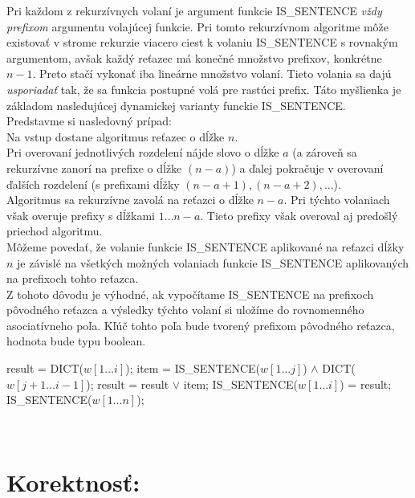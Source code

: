 \documentclass[paper=a4, fontsize=11pt]{scrartcl} %
\numberwithin{equation}{section} %
\numberwithin{figure}{section} %
\numberwithin{table}{section} %
\begin{document}
Pri každom z rekurzívnych volaní je argument funkcie IS\_SENTENCE {\em vždy prefixom} argumentu volajúcej funkcie.
Pri tomto rekurzívnom algoritme môže existovať v strome rekurzie viacero ciest k volaniu IS\_SENTENCE s rovnakým argumentom, avšak každý reťazec má konečné množstvo prefixov, konkrétne $n - 1$.
Preto stačí vykonať iba lineárne množstvo volaní.
Tieto volania sa dajú {\em usporiadať} tak, že sa funkcia postupné volá pre rastúci prefix. 
Táto myšlienka je základom nasledujúcej dynamickej varianty funckie IS\_SENTENCE.\\

Predstavme si nasledovný prípad: \ \\
Na vstup dostane algoritmus reťazec o dĺžke $n$. \ \\
Pri overovaní jednotlivých rozdelení nájde slovo o dĺžke $a$ (a zároveň sa rekurzívne zanorí na prefixe o dĺžke $(n-a)$) a ďalej pokračuje v overovaní ďalších rozdelení (s prefixami dĺžky $(n-a+1), (n-a+2), \dots$). \ \\

Algoritmus sa rekurzívne zavolá na reťazci o dĺžke $n-a$.
Pri týchto volaniach však overuje prefixy s dĺžkami $1 \dots n-a$. Tieto prefixy však overoval aj predošlý priechod algoritmu. \ \\

Môžeme povedať, že volanie funkcie IS\_SENTENCE aplikované na reťazci dĺžky $n$ je závislé na všetkých možných volaniach funkcie IS\_SENTENCE aplikovaných na prefixoch tohto reťazca. \ \\

Z tohoto dôvodu je výhodné, ak vypočítame IS\_SENTENCE na prefixoch pôvodného reťazca a výsledky týchto volaní si uložíme do rovnomenného asociatívneho poľa.
Kľúč tohto poľa bude tvorený prefixom pôvodného reťazca, hodnota bude typu boolean. \ \\


\begin{algorithmic}[1]
	\State result = DICT($w[1 \dots i]$);
                \State item = IS\_SENTENCE($w[1 \dots j]$) $\wedge$ DICT($w[j + 1 \dots i - 1]$);
		\State result = result $\vee$ item;
        \EndFor
	\State IS\_SENTENCE($w[1 \dots i]$) = result;
	\EndFor
	\State \Return  IS\_SENTENCE($w[1 \dots n]$);
    \EndFunction	
\end{algorithmic}
\ \\
 
\section*{Korektnosť:}
\end{document}
